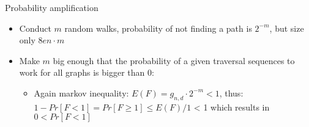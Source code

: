 \begin{frame}{Probability amplification}

\begin{itemize}
\itemsep1pt\parskip0pt
\item
  Conduct $m$ random walks, probability of not finding a path is
  $2^{-m}$, but size only $8en \cdot m$
\item
  Make $m$ big enough that the probability of a given traversal
  sequences to work for all graphs is bigger than 0:

  \begin{itemize}
  \itemsep1pt\parskip0pt
  \item
    Again markov inequality: $E(F) = g_{n, d} \cdot 2^{-m} < 1$, thus:
    $1 - Pr[F < 1] = Pr[F \geq 1] \leq E(F) / 1$ \textless{} 1 which
    results in $0 < Pr[F < 1]$
  \end{itemize}
\end{itemize}

\end{frame}
